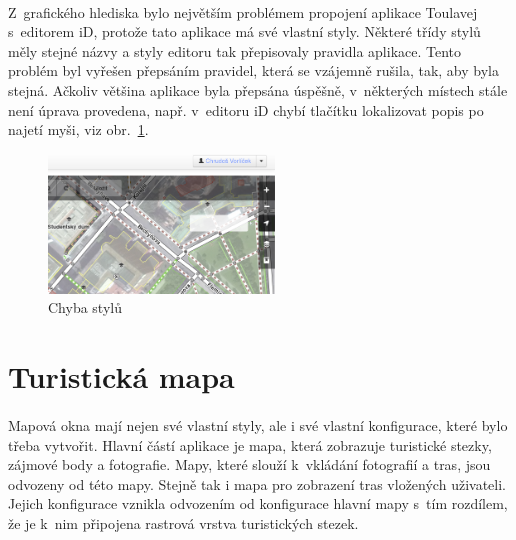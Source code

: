 \documentclass[11pt,a4paper,titlepage,oneside]{book}
\begin{document}
			\paragraph{}\label{par:grafikaId} Z~grafického hlediska bylo největším problémem propojení aplikace Toulavej s~editorem iD, protože tato aplikace má své vlastní styly. Některé třídy stylů měly stejné názvy a  styly editoru tak přepisovaly pravidla aplikace. Tento problém byl vyřešen přepsáním pravidel, která se vzájemně rušila, tak, aby byla stejná. Ačkoliv většina aplikace byla přepsána úspěšně, v~některých místech stále není úprava provedena, např. v~editoru iD chybí tlačítku lokalizovat popis po najetí myši, viz obr.~\ref{fig:error_locate}.
		\begin{figure}[!h]
			\begin{center}
				\includegraphics[width=6cm]{obrazky/toulavej/chyba_locate.png}
				\caption{Chyba stylů}
				\label{fig:error_locate}
			\end{center}
		\end{figure}	





		\section{Turistická mapa}
			\paragraph{} Mapová okna mají nejen své vlastní styly, ale i své vlastní konfigurace, které bylo třeba vytvořit. Hlavní částí aplikace je mapa, která zobrazuje turistické stezky, zájmové body a fotografie. Mapy, které slouží k~vkládání fotografií a tras, jsou odvozeny od této mapy. Stejně tak i mapa pro zobrazení tras vložených uživateli. Jejich konfigurace vznikla odvozením od konfigurace hlavní mapy s~tím rozdílem, že je k~nim připojena rastrová vrstva turistických stezek.
\end{document}
